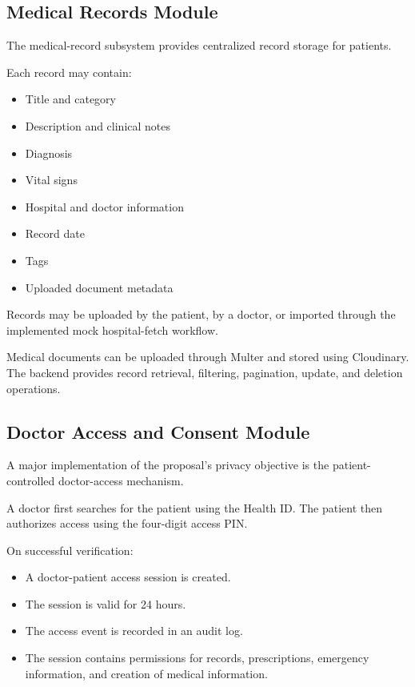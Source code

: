 \documentclass{tietreport}
\begin{document}
\subsection{Medical Records Module}

The medical-record subsystem provides centralized record storage for
patients.

Each record may contain:

\begin{itemize}
  \item Title and category
  \item Description and clinical notes
  \item Diagnosis
  \item Vital signs
  \item Hospital and doctor information
  \item Record date
  \item Tags
  \item Uploaded document metadata
\end{itemize}

Records may be uploaded by the patient, by a doctor, or imported through
the implemented mock hospital-fetch workflow.

Medical documents can be uploaded through Multer and stored using
Cloudinary. The backend provides record retrieval, filtering,
pagination, update, and deletion operations.

\subsection{Doctor Access and Consent Module}

A major implementation of the proposal's privacy objective is the
patient-controlled doctor-access mechanism.

A doctor first searches for the patient using the Health ID. The patient
then authorizes access using the four-digit access PIN.

On successful verification:

\begin{itemize}
  \item A doctor-patient access session is created.
  \item The session is valid for 24 hours.
  \item The access event is recorded in an audit log.
  \item The session contains permissions for records, prescriptions,
    emergency information, and creation of medical information.
\end{itemize}
\end{document}
